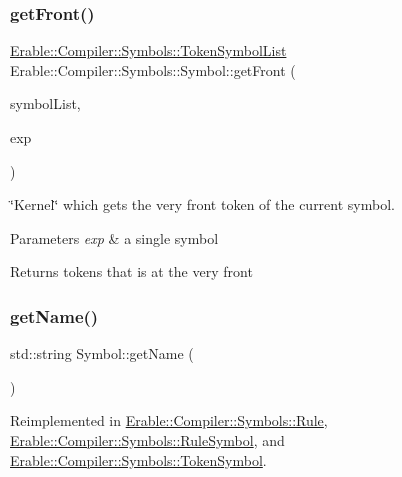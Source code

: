 \subsubsection{\texorpdfstring{getFront()}{getFront()}\hspace{0.1cm}{\footnotesize\ttfamily [3/3]}}
{\footnotesize\ttfamily \mbox{\hyperlink{namespace_erable_1_1_compiler_1_1_symbols_aff1ccebebde106c3c5f3cdca118a1d69}{Erable\+::\+Compiler\+::\+Symbols\+::\+Token\+Symbol\+List}} Erable\+::\+Compiler\+::\+Symbols\+::\+Symbol\+::get\+Front (\begin{DoxyParamCaption}\item[{\mbox{\hyperlink{namespace_erable_1_1_compiler_1_1_symbols_a63e8157d2f729d4689d27bacad42f8ed}{Symbol\+List}} \&}]{symbol\+List,  }\item[{\mbox{\hyperlink{namespace_erable_1_1_compiler_1_1_symbols_a8f0bc762f448ea4d84e8713ab3e140b9}{Symbol\+Ptr}}}]{exp }\end{DoxyParamCaption})\hspace{0.3cm}{\ttfamily [static]}}

\char`\"{}\+Kernel\char`\"{} which gets the very front token of the current symbol. 
\begin{DoxyParams}{Parameters}
{\em exp} & a single symbol \\
\hline
\end{DoxyParams}
\begin{DoxyReturn}{Returns}
tokens that is at the very front 
\end{DoxyReturn}
\mbox{\label{class_erable_1_1_compiler_1_1_symbols_1_1_symbol_a71aeae736d2ec43f0880341d53bbcc2c}} 
\subsubsection{\texorpdfstring{getName()}{getName()}}
{\footnotesize\ttfamily std\+::string Symbol\+::get\+Name (\begin{DoxyParamCaption}{ }\end{DoxyParamCaption})\hspace{0.3cm}{\ttfamily [virtual]}}



Reimplemented in \mbox{\hyperlink{class_erable_1_1_compiler_1_1_symbols_1_1_rule_a6e71596b90545fe69d089a3e706e4303}{Erable\+::\+Compiler\+::\+Symbols\+::\+Rule}}, \mbox{\hyperlink{class_erable_1_1_compiler_1_1_symbols_1_1_rule_symbol_a5f6cb5a2fc49bc62cc61035cc99464ca}{Erable\+::\+Compiler\+::\+Symbols\+::\+Rule\+Symbol}}, and \mbox{\hyperlink{class_erable_1_1_compiler_1_1_symbols_1_1_token_symbol_a2d9a65967a330721741d7f13ec299745}{Erable\+::\+Compiler\+::\+Symbols\+::\+Token\+Symbol}}.

